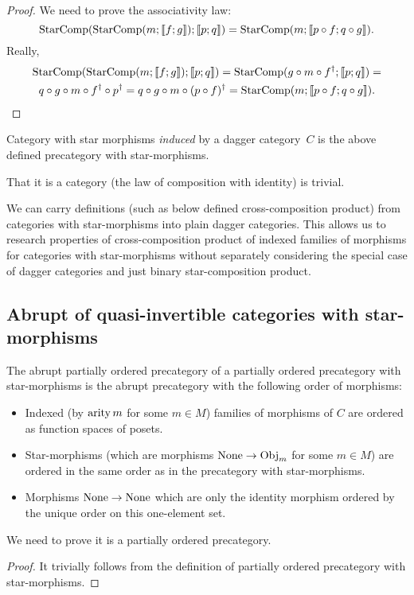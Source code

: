 \begin{proof}
We need to prove the associativity law: 
\[
\operatorname{StarComp}(\operatorname{StarComp}(m;\llbracket f;g\rrbracket);\llbracket p;q\rrbracket)=\operatorname{StarComp}(m;\llbracket p\circ f;q\circ g\rrbracket).
\]
Really,
\begin{multline*}
\operatorname{StarComp}(\operatorname{StarComp}(m;\llbracket f;g\rrbracket);\llbracket p;q\rrbracket)=\operatorname{StarComp}(g\circ m\circ f^{\dagger};\llbracket p;q\rrbracket)=\\
q\circ g\circ m\circ f^{\dagger}\circ p^{\dagger}=q\circ g\circ m\circ(p\circ f)^{\dagger}=\operatorname{StarComp}(m;\llbracket p\circ f;q\circ g\rrbracket).
\end{multline*}
\end{proof}
\begin{defn}
Category
with star morphisms \emph{induced} by a dagger category~$C$ is the
above defined precategory with star-morphisms.
\end{defn}
That it is a category (the law of composition with identity) is trivial.
\begin{rem}
We can carry definitions (such as below defined cross-composition
product) from categories with star-morphisms into plain dagger categories.
This allows us to research properties of cross-composition product
of indexed families of morphisms for categories with star-morphisms
without separately considering the special case of dagger categories
and just binary star-composition product.
\end{rem}

\subsection{Abrupt of quasi-invertible categories with star-morphisms}
\begin{defn}
The abrupt partially ordered precategory of a partially ordered precategory
with star-morphisms is the abrupt precategory with the following order
of morphisms: 
\begin{itemize}
\item Indexed (by $\operatorname{arity} m$ for some $m\in M$) families of morphisms
of $C$ are ordered as function spaces of posets.
\item Star-morphisms (which are morphisms $\operatorname{None}\rightarrow\operatorname{Obj}_{m}$ for
some $m\in M$) are ordered in the same order as in the precategory
with star-morphisms.
\item Morphisms $\operatorname{None}\rightarrow\operatorname{None}$ which are only the identity morphism
ordered by the unique order on this one-element set. 
\end{itemize}
\end{defn}
We need to prove it is a partially ordered precategory.
\begin{proof}
It trivially follows from the definition of partially ordered precategory
with star-morphisms.
\end{proof}

